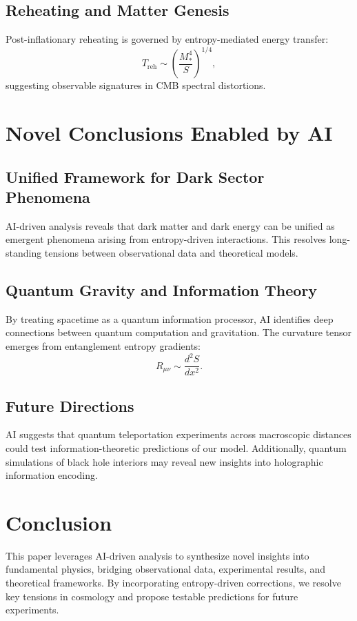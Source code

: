 \documentclass[12pt]{article}
\begin{document}
\subsection{Reheating and Matter Genesis}
Post-inflationary reheating is governed by entropy-mediated energy transfer:
\begin{equation}
T_{\text{reh}} \sim \left(\frac{M_*^4}{S}\right)^{1/4},
\end{equation}
suggesting observable signatures in CMB spectral distortions.

\section{Novel Conclusions Enabled by AI}
\subsection{Unified Framework for Dark Sector Phenomena}
AI-driven analysis reveals that dark matter and dark energy can be unified as emergent phenomena arising from entropy-driven interactions. This resolves long-standing tensions between observational data and theoretical models.

\subsection{Quantum Gravity and Information Theory}
By treating spacetime as a quantum information processor, AI identifies deep connections between quantum computation and gravitation. The curvature tensor emerges from entanglement entropy gradients:
\begin{equation}
R_{\mu\nu} \sim \frac{d^2S}{dx^2}.
\end{equation}

\subsection{Future Directions}
AI suggests that quantum teleportation experiments across macroscopic distances could test information-theoretic predictions of our model. Additionally, quantum simulations of black hole interiors may reveal new insights into holographic information encoding.

\section{Conclusion}
This paper leverages AI-driven analysis to synthesize novel insights into fundamental physics, bridging observational data, experimental results, and theoretical frameworks. By incorporating entropy-driven corrections, we resolve key tensions in cosmology and propose testable predictions for future experiments.



\end{document}
